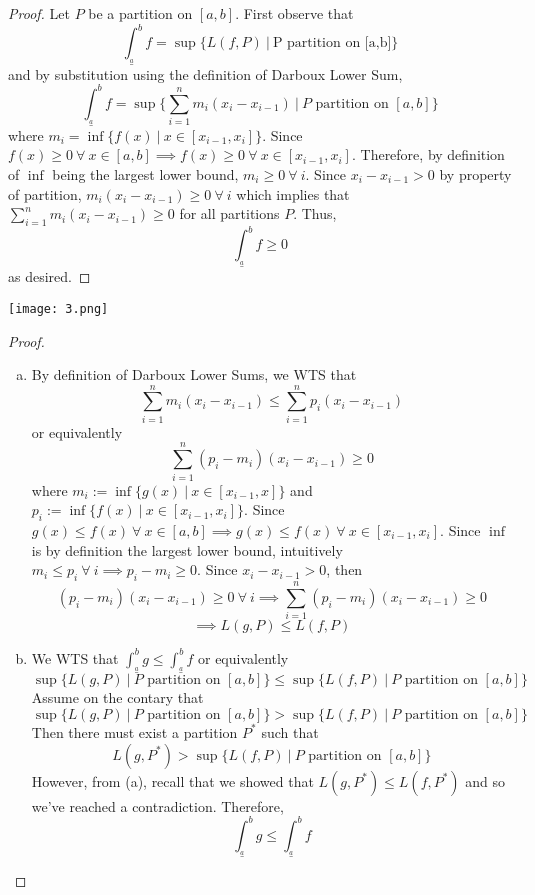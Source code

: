 \documentclass[12pt]{scrartcl}
\newcommand{\lint}{\int_{\overset{a}{\_}}^b}
\begin{document}
\begin{proof}

\hfill

Let $P$ be a partition on $[a,b]$. First observe that
\[\lint f = \sup\{L(f, P) \ | \ \text{P partition on [a,b]}\}\]
and by substitution using the definition of Darboux Lower Sum, 
\[\lint f = \sup\{\sum_{i=1}^n m_i(x_i - x_{i-1}) \ | \ P \text{ partition on } [a,b]\}\]
where $m_i = \inf\{f(x) \ | \ x \in [x_{i-1}, x_i]\}$. Since $f(x) \geq 0 \ \forall \ x \in [a,b] \implies f(x) \geq 0 \ \forall \ x \in [x_{i-1}, x_i]$. 
Therefore, by definition of $\inf$ being the largest lower bound, $m_i \geq 0 \ \forall \ i$.
Since $x_i - x_{i-1} > 0$ by property of partition, $m_i(x_i - x_{i-1}) \geq 0 \ \forall \ i$ which implies that 
$\sum_{i=1}^n m_i(x_i - x_{i-1}) \geq 0$ for all partitions $P$. Thus,
\[\lint f \geq 0\]
as desired.

\end{proof}

\newpage

\texttt{[image: 3.png]}

\begin{proof}

\hfill

\begin{enumerate}[a.]

\item By definition of Darboux Lower Sums, we WTS that 
\[\sum_{i=1}^n m_i(x_i - x_{i-1}) \leq \sum_{i=1}^n p_i(x_i - x_{i-1})\]
or equivalently
\[\sum_{i=1}^n (p_i - m_i)(x_i - x_{i-1}) \geq 0\]
where $m_i := \inf\{g(x) \ | \ x \in [x_{i-1}, x]\}$ and $p_i := \inf\{f(x) \ | \ x \in [x_{i-1}, x_i]\}$.
Since $g(x) \leq f(x) \ \forall \ x \in [a,b] \implies g(x) \leq f(x) \ \forall \ x \in [x_{i-1}, x_i]$. Since $\inf$ is by definition 
the largest lower bound, intuitively $m_i \leq p_i \ \forall \ i \implies p_i - m_i \geq 0$. Since $x_i - x_{i-1} > 0$, 
then 
\[(p_i - m_i)(x_i - x_{i-1}) \geq 0 \ \forall \ i \implies \sum_{i=1}^n (p_i-m_i)(x_i - x_{i-1}) \geq 0 \]
\[\implies L(g, P) \leq L(f, P)\]

\item We WTS that $\lint g \leq \lint f$ or equivalently 
\[\sup\{L(g, P) \ | \ P \text{ partition on } [a,b]\} \leq \sup\{L(f, P) \ | \ P \text{ partition on } [a,b]\}\]
Assume on the contary that 
\[\sup\{L(g, P) \ | \ P \text{ partition on } [a,b]\} > \sup\{L(f, P) \ | \ P \text{ partition on } [a,b]\}\]
Then there must exist a partition $P^*$ such that 
\[L(g, P^*) > \sup\{L(f, P) \ | \ P \text{ partition on } [a,b]\}\]
However, from (a), recall that we showed that $L(g, P^*) \leq L(f, P^*)$
and so we've reached a contradiction. Therefore, 
\[\lint g \leq \lint f\]
\end{enumerate}

\end{proof}
\end{document}
